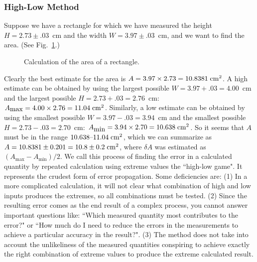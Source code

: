 \subsubsection*{High-Low Method}
\label{par:high.low.game}
Suppose we have a rectangle
for which we have measured the height $H=2.73\pm .03$~cm and the 
width $W=3.97\pm.03$~cm, and we
want to find the area.  (See Fig.~\ref{fig:rect}.)
\begin{figure}[hbt]
\begin{center}
{}
\end{center}
 \caption{Calculation of the area of a rectangle.  \label{fig:rect}}
\end{figure}
Clearly the best estimate for the area is $A=3.97\times2.73=10.8381\;{\rm cm^2}$.
A high estimate can be obtained by using the largest possible $W=3.97+.03=4.00$~cm
and the largest possible  $H=2.73+.03=2.76$~cm: 
$A_{\mbox{max}}=4.00\times2.76=11.04\;{\rm cm^2}$. Similarly,
a low estimate can be obtained by using the smallest possible $W=3.97-.03=3.94$~cm
and the smallest possible  $H=2.73-.03=2.70$~cm: 
$A_{\mbox{min}}=3.94\times2.70=10.638\;{\rm cm^2}$. So it seems that
$A$ must be in the range $10.638\mbox{--}11.04\;{\rm cm^2}$, which we can summarize as
$A=10.8381\pm 0.201 = 10.8\pm 0.2\;{\rm cm^2}$, where $\delta A$ was estimated
as $(A_{\mbox{max}}-A_{\mbox{min}})/2$.  We call this process of finding the
error in a calculated quantity by repeated calculation using extreme values
the ``high-low game".  It represents the crudest form of error propagation.
Some deficiencies are: (1) In a more complicated calculation, it will not clear what combination
of high and low inputs produces the extremes, so all combinations must be tested.
(2) Since the resulting error comes as the end result of a complex process, you cannot
answer important questions like: ``Which measured quantity most contributes
to the error?" or ``How much do I need to reduce the errors in the measurements to
achieve a particular accuracy in the result?".  (3) The method does not take into
account the unlikeliness of the measured quantities conspiring to achieve exactly the
right combination of extreme values to produce the extreme calculated result.

